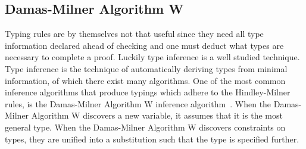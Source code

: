 


\subsection{Damas-Milner Algorithm W}
\label{subsec:algw}
Typing rules are by themselves not that useful since they need all type information declared ahead of checking and one must deduct what types are necessary to complete a proof.
Luckily type inference is a well studied technique.
Type inference is the technique of automatically deriving types from minimal information, of which there exist many algorithms.
One of the most common inference algorithms that produce typings which adhere to the Hindley-Milner rules, is the Damas-Milner Algorithm W inference algorithm~\cite{damas1984type,damas1982principal}.
When the Damas-Milner Algorithm W discovers a new variable, it assumes that it is the most general type.
When the Damas-Milner Algorithm W discovers constraints on types, they are unified into a substitution such that the type is specified further.

